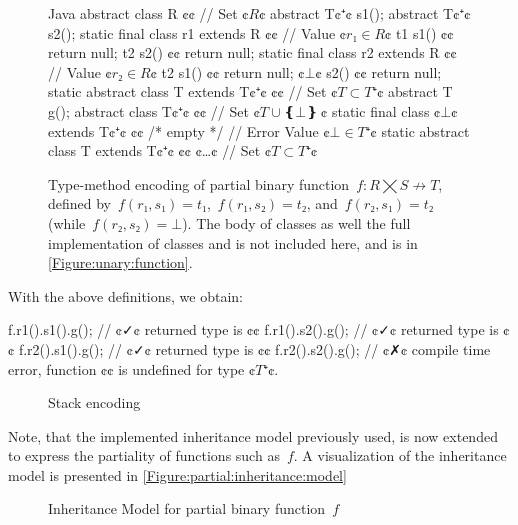 \begin{figure}[hbt]
  \begin{Code}{Java}
abstract class R {¢¢ // Set ¢$R$¢
  abstract T¢$⁺$¢ s1();
  abstract T¢$⁺$¢ s2();
  static final class r1 extends R {¢¢ // Value ¢$r₁∈R$¢
    t1 s1() {¢¢ return null; }
    t2 s2() {¢¢ return null; }
  }
  static final class r2 extends R {¢¢ // Value ¢$r₂∈R$¢
    t2 s1() {¢¢ return null; }
    ¢$⊥$¢ s2() {¢¢ return null; }
  }
  static abstract class T extends T¢$⁺$¢ {¢¢ // Set ¢$T⊂T⁺$¢
    abstract T g();
  }
  abstract class T¢$⁺$¢ {¢¢ // Set ¢$T∪❴⊥❵~$¢
    static final class ¢$⊥$¢ extends T¢$⁺$¢ {¢¢ /* empty */ } // Error Value ¢$⊥∈T⁺$¢
    static abstract class T extends T¢$⁺$¢ {¢¢ ¢…¢ } // Set ¢$T⊂T⁺$¢
  }
}
\end{Code}
  \caption{Type-method encoding of partial binary function~$f: R⨉S↛T$,
  defined by~$f(r₁,s₁)=t₁$,~$f(r₁,s₂)=t₂$, and~$f(r₂,s₁)=t₂$ (while~$f(r₂, s₂) =⊥$).
  The body of classes  as well the full implementation of classes  and  is not included here, and is
    in \cref{Figure:unary:function}.}
  \label{Figure:simple:binary}
\end{figure}

With the above definitions, we obtain:
\begin{JAVA}
f.r1().s1().g(); // ¢✓¢ returned type is ¢¢
f.r1().s2().g(); // ¢✓¢ returned type is ¢¢
f.r2().s1().g(); // ¢✓¢ returned type is ¢¢
f.r2().s2().g(); // ¢✗¢ compile time error, function ¢¢ is undefined for type ¢$T⁺$¢.
\end{JAVA}

\begin{figure}[h]
   
  \caption{Stack encoding}
  \label{Figure:stack:encoding}
\end{figure}


Note, that the implemented inheritance model previously used, is now extended to express the partiality
  of functions such as~$f$. A visualization of the inheritance model is presented in \cref{Figure:partial:inheritance:model}

\begin{figure}[ht]
  \label{Figure:partial:inheritence:model}
  \caption{Inheritance Model for partial binary function~$f$}
  \begin{adjustbox}{max width=0.6\linewidth}
    
  \end{adjustbox}
\end{figure}

